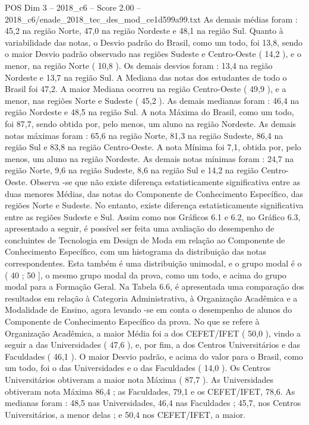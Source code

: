 \begin{textsample}{POS Dim 3 – 2018\_c6 – Score 2.00 – 2018\_c6/enade\_2018\_tec\_des\_mod\_ce1d599a99.txt}
As demais médias foram : 45,2 na região Norte, 47,0 na região Nordeste e 48,1 na região Sul.
Quanto à variabilidade das notas, o Desvio padrão do Brasil, como um todo, foi 13,8, sendo o maior Desvio padrão observado nas regiões Sudeste e Centro-Oeste ( 14,2 ), e o menor, na região Norte ( 10,8 ).
Os demais desvios foram : 13,4 na região Nordeste e 13,7 na região Sul.
A Mediana das notas dos estudantes de todo o Brasil foi 47,2.
A maior Mediana ocorreu na região Centro-Oeste ( 49,9 ), e a menor, nas regiões Norte e Sudeste ( 45,2 ).
As demais medianas foram : 46,4 na região Nordeste e 48,5 na região Sul.
A nota Máxima do Brasil, como um todo, foi 87,7, sendo obtida por, pelo menos, um aluno na região Nordeste.
As demais notas máximas foram : 65,6 na região Norte, 81,3 na região Sudeste, 86,4 na região Sul e 83,8 na região Centro-Oeste.
A nota Mínima foi 7,1, obtida por, pelo menos, um aluno na região Nordeste.
As demais notas mínimas foram : 24,7 na região Norte, 9,6 na região Sudeste, 8,6 na região Sul e 14,2 na região Centro-Oeste.
Observa -se que não existe diferença estatisticamente significativa entre as duas menores Médias, das notas do Componente de Conhecimento Específico, das regiões Norte e Sudeste.
No entanto, existe diferença estatisticamente significativa entre as regiões Sudeste e Sul.
Assim como nos Gráficos 6.1 e 6.2, no Gráfico 6.3, apresentado a seguir, é possível ser feita uma avaliação do desempenho de concluintes de Tecnologia em Design de Moda em relação ao Componente de Conhecimento Específico, com um histograma da distribuição das notas correspondentes.
Esta também é uma distribuição unimodal, e o grupo modal é o ( 40 ; 50 ], o mesmo grupo modal da prova, como um todo, e acima do grupo modal para a Formação Geral.
Na Tabela 6.6, é apresentada uma comparação dos resultados em relação à Categoria Administrativa, à Organização Acadêmica e a Modalidade de Ensino, agora levando -se em conta o desempenho de alunos do Componente de Conhecimento Específico da prova.
No que se refere à Organização Acadêmica, a maior Média foi a dos CEFET/IFET ( 50,0 ), vindo a seguir a das Universidades ( 47,6 ), e, por fim, a dos Centros Universitários e das Faculdades ( 46,1 ).
O maior Desvio padrão, e acima do valor para o Brasil, como um todo, foi o das Universidades e o das Faculdades ( 14,0 ).
Os Centros Universitários obtiveram a maior nota Máxima ( 87,7 ).
As Universidades obtiveram nota Máxima 86,4 ; as Faculdades, 79,1 e os CEFET/IFET, 78,6.
As medianas foram : 48,5 nas Universidades, 46,4 nas Faculdades ; 45,7, nos Centros Universitários, a menor delas ; e 50,4 nos CEFET/IFET, a maior.

\end{textsample}
